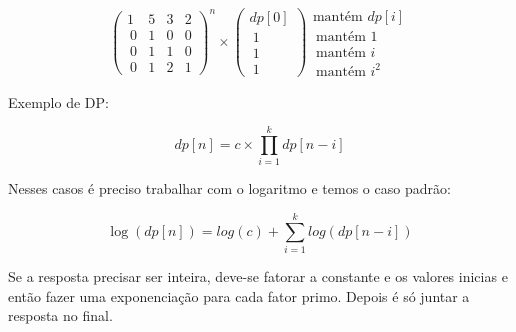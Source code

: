 \documentclass[11pt, a4paper, oneside]{book}
\begin{document}
$$ \begin{pmatrix} 1&5&3&2 \\\ 0&1&0&0 \\\ 0&1&1&0 \\\ 0&1&2&1 \end{pmatrix}^n \times \begin{pmatrix} dp[0]   \\\ 1       \\\ 1       \\\ 1\end {pmatrix} \begin{matrix} \text{mantém } dp[i]   \\\ \text{mantém }1       \\\ \text{mantém }i       \\\ \text{mantém }i^2      \end {matrix} $$



\textbf{} 


Exemplo de DP:



$$ dp[n] =  c\times \prod_{i=1}^{k} dp[n-i] $$



Nesses casos é preciso trabalhar com o logaritmo e temos o caso padrão:





$$ \log(dp[n]) =  log(c) + \sum_{i=1}^{k} log(dp[n-i]) $$



Se a resposta precisar ser inteira, deve-se fatorar a constante e os valores inicias e então fazer uma exponenciação para cada fator primo. Depois é só juntar a resposta no final.

\hfill
\end{document}
